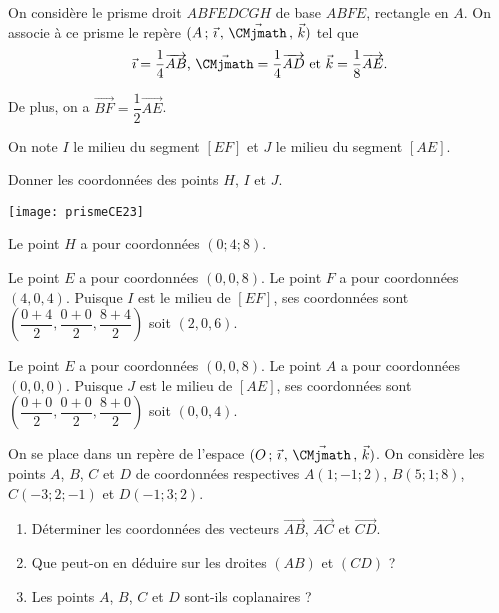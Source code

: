 \documentclass[11pt,fleqn, openany]{book} %
\begin{document}
\begin{exercise}[subtitle={(Centres étrangers 2023)}]\hspace{0pt}
\begin{minipage}{0.65\linewidth}
On considère le prisme droit $ABFEDCGH$ de base $ABFE$, rectangle en $A$. On associe à ce prisme le repère $(A\,;\,\vec{\imath}\,,\,\vec{\CMjmath}\,,\,\vec{k})$ tel que \[\vec{\imath}=\dfrac{1}{4}\overrightarrow{AB}$, $\vec{\CMjmath}=\dfrac{1}{4}\overrightarrow{AD}$ et $\vec{k}=\dfrac{1}{8}\overrightarrow{AE}.\]

De plus, on a $\overrightarrow{BF}=\dfrac{1}{2}\overrightarrow{AE}$.

On note $I$ le milieu du segment $[EF]$ et $J$ le milieu du segment $[AE]$.

Donner les coordonnées des points $H$, $I$ et $J$.
\end{minipage}\hfill\begin{minipage}{0.33\linewidth}
\begin{center}
\texttt{[image: prismeCE23]}
\end{center}
\end{minipage}\end{exercise}

\begin{solution}
Le point $H$ a pour coordonnées $(0;4;8)$.

Le point $E$ a pour coordonnées $(0,0,8)$. Le point $F$ a pour coordonnées $(4,0,4)$. Puisque $I$ est le milieu de $[EF]$, ses coordonnées sont $\left(\dfrac{0+4}{2}, \dfrac{0+0}{2}, \dfrac{8+4}{2}\right)$ soit $(2,0,6)$.

Le point $E$ a pour coordonnées $(0,0,8)$. Le point $A$ a pour coordonnées $(0,0,0)$. Puisque $J$ est le milieu de $[AE]$, ses coordonnées sont $\left(\dfrac{0+0}{2}, \dfrac{0+0}{2}, \dfrac{8+0}{2}\right)$ soit $(0,0,4)$.
\end{solution}

\begin{exercise}On se place dans un repère de l'espace $\Oijk$. On considère les points $A$, $B$, $C$ et $D$ de coordonnées respectives $A(1;-1;2)$, $B(5;1;8)$, $C(-3;2;-1)$ et $D(-1;3;2)$.
\begin{enumerate}
\item Déterminer les coordonnées des vecteurs $\overrightarrow{AB}$, $\overrightarrow{AC}$ et $\overrightarrow{CD}$.
\item Que peut-on en déduire sur les droites $(AB)$ et $(CD)$ ?
\item Les points $A$, $B$, $C$ et $D$ sont-ils coplanaires ?
\end{enumerate}\end{exercise}
\end{document}
